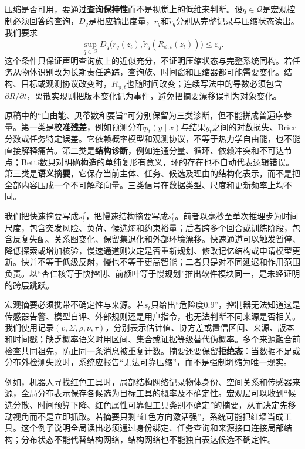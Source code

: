 压缩是否可用，要通过\textbf{查询保持性}而不是视觉上的低维来判断。设$q\in\mathcal{Q}$是宏观控制必须回答的查询，$D_q$是相应输出度量，$r_q$和$\tilde r_q$分别从完整记录与压缩状态读出。我们要求
\[
\sup_{q\in\mathcal{Q}}D_q\bigl(r_q(z_t),\tilde r_q(R_{\phi,t}(z_t))\bigr)\le\varepsilon_q .
\]
这个条件只保证声明查询族上的近似充分，不证明压缩状态与完整系统同构。若任务从物体识别改为长期责任追踪，查询族、时间窗和压缩器都可能需要变化。结构、目标或观测协议改变时，$R_{\phi,t}$也随时间改变；连续写法中的导数必须包含$\partial R/\partial t$，离散实现则把版本变化记为事件，避免把摘要漂移误判为对象变化。

原稿中的“自由能、贝蒂数和要旨”可分别保留为三类诊断，但不能拼成普遍序参量。第一类是\textbf{校准残差}，例如预测分布$p_t(y\mid x)$与结果$y_t$之间的对数损失、Brier分数或任务特定误差。它依赖概率模型和观测协议，不等于热力学自由能，也不能直接解释痛苦。第二类是\textbf{结构诊断}，例如连通分量、循环、依赖冲突和不可达节点；Betti数只对明确构造的单纯复形有意义，环的存在也不自动代表逻辑错误。第三类是\textbf{语义摘要}，它保存当前主体、任务、候选及理由的结构化表示，而不是把全部内容压成一个不可解释向量。三类信号在数据类型、尺度和更新频率上均不同。

我们把快速摘要写成$s_t^{f}$，把慢速结构摘要写成$s_t^{s}$。前者以毫秒至单次推理步为时间尺度，包含突发风险、负荷、候选熵和约束裕量；后者跨多个回合或训练阶段，包含反复失配、关系图变化、保留集退化和外部环境漂移。快速通道可以触发暂停、降低探索或增加核验，慢速通道则决定是否重新规划、修改记忆结构或申请模型更新。快并不等于低级反射，慢也不等于更高智能；二者只是对不同延迟和作用范围负责。以“杏仁核等于快控制、前额叶等于慢规划”推出软件模块同一，是未经证明的跨层跳跃。

宏观摘要必须携带不确定性与来源。若$s_t$只给出“危险度0.9”，控制器无法知道这是传感器告警、模型自评、外部规则还是用户指令，也无法判断不同来源是否相关。我们使用记录$(v,\Sigma,\rho,\nu,\tau)$，分别表示估计值、协方差或置信区间、来源、版本和时间戳；缺乏概率语义时用区间、集合或证据等级替代伪概率。多个来源融合前检查共同祖先，防止同一条消息被重复计数。摘要还要保留\textbf{拒绝态}：当数据不足或分布外检测失败时，系统应报告“无法可靠压缩”，而不是强制坍缩为唯一现实。

例如，机器人寻找红色工具时，局部结构网络记录物体身份、空间关系和传感器来源，全局分布表示保存各候选为目标工具的概率及不确定性。宏观层可以收到“候选分散、时间预算下降、红色属性可靠但工具类别不确定”的摘要，从而决定先移动视角而不是立即抓取。若摘要只剩“红色方向激活强”，系统可能把红墙当成工具。这个例子说明全局读出必须通过身份绑定、任务查询和来源接口连接局部结构；分布状态不能代替结构网络，结构网络也不能独自表达候选不确定性。

